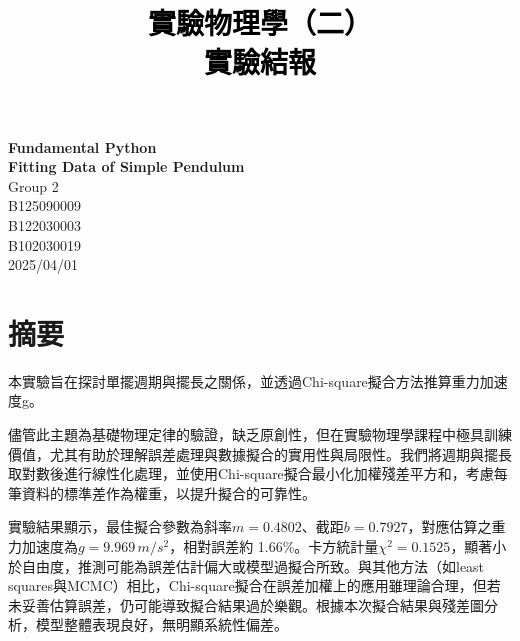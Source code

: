 \documentclass[12pt,a4paper]{article}
\title{\vspace{-0.5cm}
       {\bf \textcolor{black}{{\LARGE 
       \begin{CJK}{UTF8}{bkai}
       實驗物理學（二）\\
       \vspace{6pt}
        實驗結報\\
       \end{CJK}
       }}
       }
       }
\author{}
\date{}
\begin{document}
\begin{CJK}{UTF8}{bkai}

\maketitle
\thispagestyle{empty}

\vspace{10cm}
\begin{center}
{\bf \LARGE \vspace{-11cm} Fundamental Python\\
\vspace{0.25cm} Fitting Data of Simple Pendulum}\\
\vspace{13cm}
{\large Group 2}\\ \vspace{12pt}
{\large {} B125090009}\\ \vspace{6pt}
{\large {}  B122030003}\\ \vspace{6pt}
{\large {} B102030019}\\ \vspace{12pt}
{\large 2025/04/01}\\
\end{center}

\clearpage

\section{摘要}
\hfill

本實驗旨在探討單擺週期與擺長之關係，並透過Chi-square擬合方法推算重力加速度g。

儘管此主題為基礎物理定律的驗證，缺乏原創性，但在實驗物理學課程中極具訓練價值，尤其有助於理解誤差處理與數據擬合的實用性與局限性。我們將週期與擺長取對數後進行線性化處理，並使用Chi-square擬合最小化加權殘差平方和，考慮每筆資料的標準差作為權重，以提升擬合的可靠性。

實驗結果顯示，最佳擬合參數為斜率$m=0.4802$、截距$b=0.7927$，對應估算之重力加速度為$g=9.969 \,m/s^2$，相對誤差約 1.66\%。卡方統計量$\chi^2=0.1525$，顯著小於自由度，推測可能為誤差估計偏大或模型過擬合所致。與其他方法（如least squares與MCMC）相比，Chi-square擬合在誤差加權上的應用雖理論合理，但若未妥善估算誤差，仍可能導致擬合結果過於樂觀。根據本次擬合結果與殘差圖分析，模型整體表現良好，無明顯系統性偏差。


\end{CJK}
\end{document}
